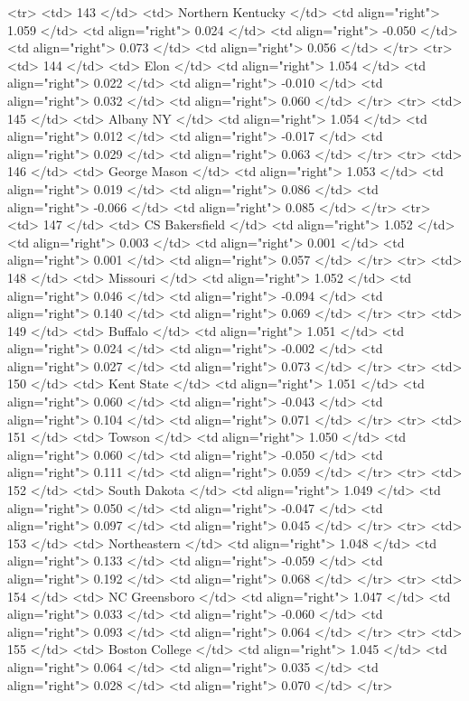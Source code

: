   <tr> <td> 143 </td> <td> Northern Kentucky </td> <td align="right"> 1.059 </td> <td align="right"> 0.024 </td> <td align="right"> -0.050 </td> <td align="right"> 0.073 </td> <td align="right"> 0.056 </td> </tr>
  <tr> <td> 144 </td> <td> Elon </td> <td align="right"> 1.054 </td> <td align="right"> 0.022 </td> <td align="right"> -0.010 </td> <td align="right"> 0.032 </td> <td align="right"> 0.060 </td> </tr>
  <tr> <td> 145 </td> <td> Albany NY </td> <td align="right"> 1.054 </td> <td align="right"> 0.012 </td> <td align="right"> -0.017 </td> <td align="right"> 0.029 </td> <td align="right"> 0.063 </td> </tr>
  <tr> <td> 146 </td> <td> George Mason </td> <td align="right"> 1.053 </td> <td align="right"> 0.019 </td> <td align="right"> 0.086 </td> <td align="right"> -0.066 </td> <td align="right"> 0.085 </td> </tr>
  <tr> <td> 147 </td> <td> CS Bakersfield </td> <td align="right"> 1.052 </td> <td align="right"> 0.003 </td> <td align="right"> 0.001 </td> <td align="right"> 0.001 </td> <td align="right"> 0.057 </td> </tr>
  <tr> <td> 148 </td> <td> Missouri </td> <td align="right"> 1.052 </td> <td align="right"> 0.046 </td> <td align="right"> -0.094 </td> <td align="right"> 0.140 </td> <td align="right"> 0.069 </td> </tr>
  <tr> <td> 149 </td> <td> Buffalo </td> <td align="right"> 1.051 </td> <td align="right"> 0.024 </td> <td align="right"> -0.002 </td> <td align="right"> 0.027 </td> <td align="right"> 0.073 </td> </tr>
  <tr> <td> 150 </td> <td> Kent State </td> <td align="right"> 1.051 </td> <td align="right"> 0.060 </td> <td align="right"> -0.043 </td> <td align="right"> 0.104 </td> <td align="right"> 0.071 </td> </tr>
  <tr> <td> 151 </td> <td> Towson </td> <td align="right"> 1.050 </td> <td align="right"> 0.060 </td> <td align="right"> -0.050 </td> <td align="right"> 0.111 </td> <td align="right"> 0.059 </td> </tr>
  <tr> <td> 152 </td> <td> South Dakota </td> <td align="right"> 1.049 </td> <td align="right"> 0.050 </td> <td align="right"> -0.047 </td> <td align="right"> 0.097 </td> <td align="right"> 0.045 </td> </tr>
  <tr> <td> 153 </td> <td> Northeastern </td> <td align="right"> 1.048 </td> <td align="right"> 0.133 </td> <td align="right"> -0.059 </td> <td align="right"> 0.192 </td> <td align="right"> 0.068 </td> </tr>
  <tr> <td> 154 </td> <td> NC Greensboro </td> <td align="right"> 1.047 </td> <td align="right"> 0.033 </td> <td align="right"> -0.060 </td> <td align="right"> 0.093 </td> <td align="right"> 0.064 </td> </tr>
  <tr> <td> 155 </td> <td> Boston College </td> <td align="right"> 1.045 </td> <td align="right"> 0.064 </td> <td align="right"> 0.035 </td> <td align="right"> 0.028 </td> <td align="right"> 0.070 </td> </tr>
